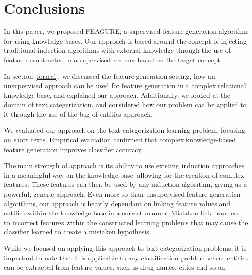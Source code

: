 \documentclass[twoside,11pt]{article}
\theoremstyle{definition}
\begin{document}


\section{Conclusions}

In this paper, we proposed FEAGURE, a supervised feature generation algorithm for using knowledge bases. Our approach is based around the concept of injecting traditional induction algorithms with external knowledge through the use of features constructed in a supervised manner based on the target concept. 

In section \ref{formal}, we discussed the feature generation setting, how an unsupervised approach can be used for feature generation in a complex relational knowledge base, and explained our approach.
Additionally, we looked at the domain of text categorization, and considered how our problem can be applied to it through the use of the bag-of-entities approach.

We evaluated our approach on the text categorization learning problem, focusing on short texts. Empirical evaluation confirmed that complex knowledge-based feature generation improves classifier accuracy. 

The main strength of approach is its ability to use existing induction approaches in a meaningful way on the knowledge base, allowing for the creation of complex features. These features can then be used by any induction algorithm, giving us a powerful, generic approach.
Even more so than unsupervised feature generation algorithms,  our approach is heavily dependant on linking feature values and entities within the knowledge base in a correct manner. Mistaken links can lead to incorrect features within the constructed learning problems that may cause the classifier learned to create a mistaken hypothesis. 

While we focused on applying this approach to text categorization problems, it is important to note that it is applicable to any classification problem where entities can be extracted from feature values, such as drug names, cities and so on. 

\clearpage
\vskip 0.2in


\end{document}
